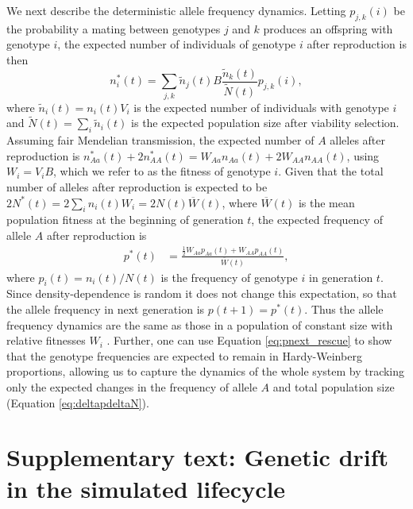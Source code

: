 \documentclass[]{article}
\begin{document}
We next describe the deterministic allele frequency dynamics.
Letting $p_{j,k}(i)$ be the probability a mating between genotypes $j$ and $k$ produces an offspring with genotype $i$, the expected number of individuals of genotype $i$ after reproduction is then  
\begin{equation}
n_i^*(t) = \sum_{j,k} \tilde{n}_j(t) B \frac{\tilde{n}_k(t)}{\tilde{N}(t)}p_{j,k}(i),
\end{equation}
where $\tilde{n}_i(t) = n_i(t) V_i$ is the expected number of individuals with genotype $i$ and $\tilde{N}(t) = \sum_i{\tilde{n}_i(t)}$ is the expected population size after viability selection.
Assuming fair Mendelian transmission, the expected number of $A$ alleles after reproduction is $n_{Aa}^*(t) + 2n_{AA}^*(t) = W_{Aa} n_{Aa}(t) + 2 W_{AA} n_{AA}(t)$, using $W_i = V_i B$, which we refer to as the fitness of genotype $i$.
Given that the total number of alleles after reproduction is expected to be $2N^*(t) = 2\sum_i n_i(t) W_i = 2N(t) \overline{W}(t)$, where $\overline{W}(t)$ is the mean population fitness at the beginning of generation $t$, the expected frequency of allele $A$ after reproduction is
\begin{equation}\label{eq:pnext_rescue}
\begin{aligned}
p^*(t) &= \frac{\frac{1}{2} W_{Aa} p_{Aa}(t) + W_{AA} p_{AA}(t)}{\overline{W}(t)},
\end{aligned}
\end{equation}
where $p_i(t)=n_i(t)/N(t)$ is the frequency of genotype $i$ in generation $t$.
Since density-dependence is random it does not change this expectation, so that the allele frequency in next generation is $p(t+1)=p^*(t)$.
Thus the allele frequency dynamics are the same as those in a population of constant size with relative fitnesses $W_i$ \citep[equation 5.2.3 in][]{crow1970introduction}.
Further, one can use Equation \ref{eq:pnext_rescue} to show that the genotype frequencies are expected to remain in Hardy-Weinberg proportions, allowing us to capture the dynamics of the whole system by tracking only the expected changes in the frequency of allele $A$ and total population size (Equation \ref{eq:deltapdeltaN}).

\section*{Supplementary text: Genetic drift in the simulated lifecycle}
\label{sec:pestNe}
\end{document}
